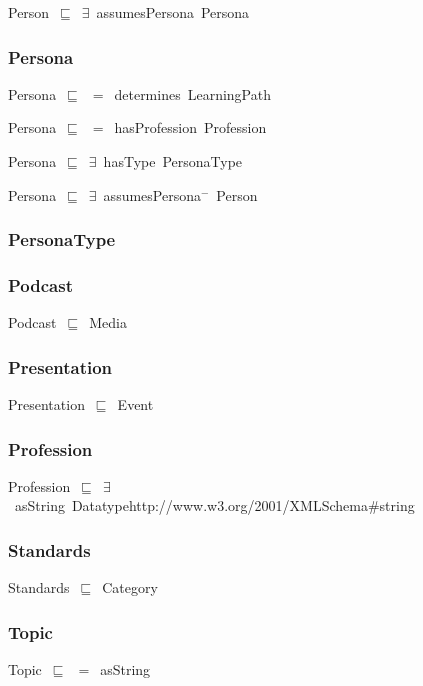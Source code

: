 \documentclass{article}
\begin{document}
Person~\ensuremath{\sqsubseteq}~\ensuremath{\exists}~assumesPersona~Persona~

\subsubsection*{Persona}

Persona~\ensuremath{\sqsubseteq}~\ensuremath{=}~determines~LearningPath~

Persona~\ensuremath{\sqsubseteq}~\ensuremath{=}~hasProfession~Profession~

Persona~\ensuremath{\sqsubseteq}~\ensuremath{\exists}~hasType~PersonaType~

Persona~\ensuremath{\sqsubseteq}~\ensuremath{\exists}~assumesPersona\ensuremath{^-}~Person~

\subsubsection*{PersonaType}

\subsubsection*{Podcast}

Podcast~\ensuremath{\sqsubseteq}~Media~

\subsubsection*{Presentation}

Presentation~\ensuremath{\sqsubseteq}~Event~

\subsubsection*{Profession}

Profession~\ensuremath{\sqsubseteq}~\ensuremath{\exists}~asString~Datatypehttp://www.w3.org/2001/XMLSchema#string~

\subsubsection*{Standards}

Standards~\ensuremath{\sqsubseteq}~Category~

\subsubsection*{Topic}

Topic~\ensuremath{\sqsubseteq}~\ensuremath{=}~asString~
\end{document}
